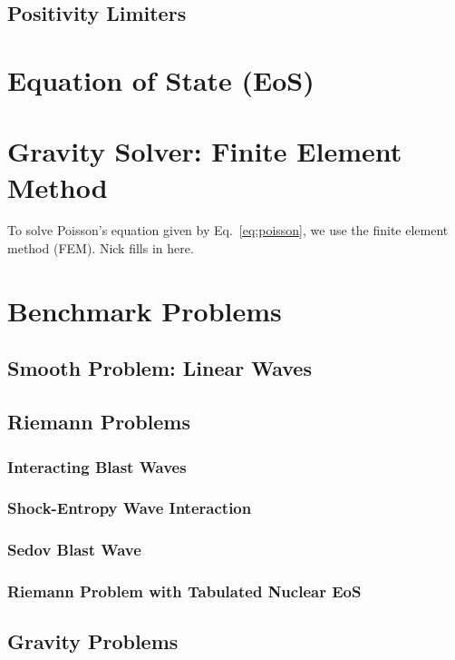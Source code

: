 \documentclass[10pt,preprint]{aastex}
\newcommand{\ee}[1]{{\color{red} #1}}
\begin{document}
\subsection{Positivity Limiters}

\section{Equation of State (EoS)}

\section{Gravity Solver: Finite Element Method}

To solve Poisson's equation given by Eq.~\eqref{eq:poisson}, we use the finite element method (FEM).  
\ee{Nick fills in here}.  

\section{Benchmark Problems}

\subsection{Smooth Problem: Linear Waves}

\subsection{Riemann Problems}

\subsubsection{Interacting Blast Waves}

\subsubsection{Shock-Entropy Wave Interaction}

\subsubsection{Sedov Blast Wave}

\subsubsection{Riemann Problem with Tabulated Nuclear EoS}

\subsection{Gravity Problems}
\end{document}

